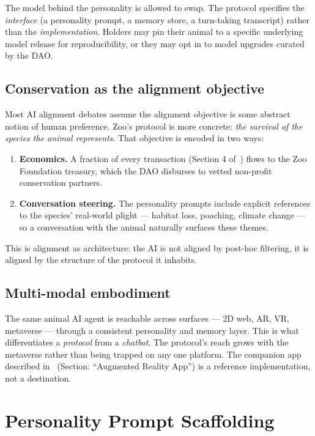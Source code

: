 \documentclass[11pt,letterpaper]{article}
\begin{document}
The model behind the personality is allowed to swap. The protocol specifies the \emph{interface} (a personality prompt, a memory store, a turn-taking transcript) rather than the \emph{implementation}. Holders may pin their animal to a specific underlying model release for reproducibility, or they may opt in to model upgrades curated by the DAO.

\subsection{Conservation as the alignment objective}

Most AI alignment debates assume the alignment objective is some abstract notion of human preference. Zoo's protocol is more concrete: \emph{the survival of the species the animal represents}. That objective is encoded in two ways:

\begin{enumerate}
  \item \textbf{Economics.} A fraction of every transaction (Section 4 of~\cite{zoo2021}) flows to the Zoo Foundation treasury, which the DAO disburses to vetted non-profit conservation partners.
  \item \textbf{Conversation steering.} The personality prompts include explicit references to the species' real-world plight --- habitat loss, poaching, climate change --- so a conversation with the animal naturally surfaces these themes.
\end{enumerate}

This is alignment as architecture: the AI is not aligned by post-hoc filtering, it is aligned by the structure of the protocol it inhabits.

\subsection{Multi-modal embodiment}

The same animal AI agent is reachable across surfaces --- 2D web, AR, VR, metaverse --- through a consistent personality and memory layer. This is what differentiates a \emph{protocol} from a \emph{chatbot}. The protocol's reach grows with the metaverse rather than being trapped on any one platform. The companion app described in~\cite{zoo2021} (Section: ``Augmented Reality App'') is a reference implementation, not a destination.

\section{Personality Prompt Scaffolding}
\end{document}
